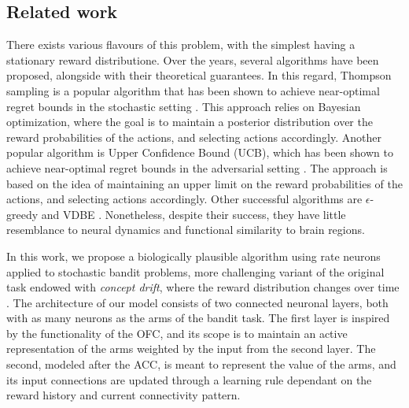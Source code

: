 \subsection{Related work}
There exists various flavours of this problem, with the simplest having a stationary reward distributione.
Over the years, several algorithms have been proposed, alongside with their theoretical guarantees.
In this regard, Thompson sampling is a popular algorithm that has been shown to achieve near-optimal regret bounds in the stochastic setting \cite{agrawalAnalysisThompsonSampling2012, kaufmannThompsonSamplingAsymptotically2012}.
This approach relies on Bayesian optimization, where the goal is to maintain a posterior distribution over the reward probabilities of the actions, and selecting actions accordingly.
Another popular algorithm is Upper Confidence Bound (UCB), which has been shown to achieve near-optimal regret bounds in the adversarial setting \cite{auerFinitetimeAnalysisMultiarmed2002}.
The approach is based on the idea of maintaining an upper limit on the reward probabilities of the actions, and selecting actions accordingly.
Other successful algorithms are $\epsilon$-greedy and VDBE \cite{gittinsBanditProcessesDynamic1979, banMultifacetContextualBandits2021, tokicAdaptiveEGreedyExploration2010, tokicValueDifferenceBasedExploration2011}.
Nonetheless, despite their success, they have little resemblance to neural dynamics and functional similarity to brain regions.

In this work, we propose a biologically plausible algorithm using rate neurons applied to stochastic bandit problems, more challenging variant of the original task endowed with \textit{concept drift}, where the reward distribution changes over time \cite{garivierUpperConfidenceBoundPolicies2008, besbesStochasticMultiArmedBanditProblem2014, cavenaghiNonStationaryMultiArmed2021}.
The architecture of our model consists of two connected neuronal layers, both with as many neurons as the arms of the bandit task.
The first layer is inspired by the functionality of the OFC, and its scope is to maintain an active representation of the arms weighted by the input from the second layer.
The second, modeled after the ACC, is meant to represent the value of the arms, and its input connections are updated through a learning rule dependant on the reward history and current connectivity pattern.

